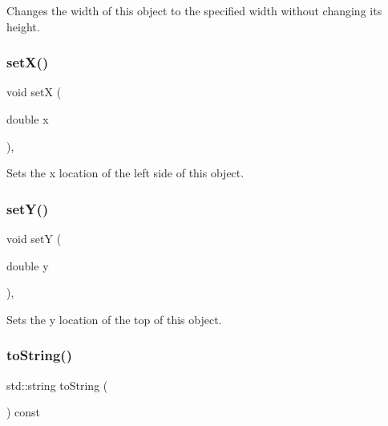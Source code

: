 Changes the width of this object to the specified width without changing its height. 

\mbox{\label{classGObject_a9c18fcc579333bf9653d13ad2b372e39}} 
\subsubsection{\texorpdfstring{set\+X()}{setX()}}
{\footnotesize\ttfamily void setX (\begin{DoxyParamCaption}\item[{double}]{x }\end{DoxyParamCaption})\hspace{0.3cm}{\ttfamily [virtual]}, {\ttfamily [inherited]}}



Sets the x location of the left side of this object. 

\mbox{\label{classGObject_a7d57e2a5c35d27feb58fd498a3cf82b9}} 
\subsubsection{\texorpdfstring{set\+Y()}{setY()}}
{\footnotesize\ttfamily void setY (\begin{DoxyParamCaption}\item[{double}]{y }\end{DoxyParamCaption})\hspace{0.3cm}{\ttfamily [virtual]}, {\ttfamily [inherited]}}



Sets the y location of the top of this object. 

\mbox{\label{classGCompound_add86bda25fd0c3b8edaedee9431b85e6}} 
\subsubsection{\texorpdfstring{to\+String()}{toString()}}
{\footnotesize\ttfamily std\+::string to\+String (\begin{DoxyParamCaption}{ }\end{DoxyParamCaption}) const\hspace{0.3cm}{\ttfamily [virtual]}}



